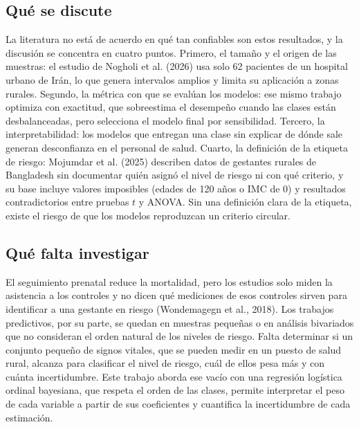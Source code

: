 \subsection{Qué se discute}
La literatura no está de acuerdo en qué tan confiables son estos resultados, y la
discusión se concentra en cuatro puntos. Primero, el tamaño y el origen de las
muestras: el estudio de Nogholi et al. (2026) usa solo 62 pacientes de un hospital
urbano de Irán, lo que genera intervalos amplios y limita su aplicación a zonas
rurales. Segundo, la métrica con que se evalúan los modelos: ese mismo trabajo
optimiza con exactitud, que sobreestima el desempeño cuando las clases están
desbalanceadas, pero selecciona el modelo final por sensibilidad. Tercero, la
interpretabilidad: los modelos que entregan una clase sin explicar de dónde sale
generan desconfianza en el personal de salud. Cuarto, la definición de la
etiqueta de riesgo: Mojumdar et al. (2025) describen datos de gestantes rurales de
Bangladesh sin documentar quién asignó el nivel de riesgo ni con qué criterio, y su
base incluye valores imposibles (edades de 120 años o IMC de 0) y resultados
contradictorios entre pruebas $t$ y ANOVA. Sin una definición clara de la
etiqueta, existe el riesgo de que los modelos reproduzcan un criterio circular.

\subsection{Qué falta investigar}
El seguimiento prenatal reduce la mortalidad, pero los estudios solo miden la
asistencia a los controles y no dicen qué mediciones de esos controles sirven
para identificar a una gestante en riesgo (Wondemagegn et al., 2018). Los trabajos
predictivos, por su parte, se quedan en muestras pequeñas o en análisis
bivariados que no consideran el orden natural de los niveles de riesgo. Falta
determinar si un conjunto pequeño de signos vitales, que se pueden medir en un
puesto de salud rural, alcanza para clasificar el nivel de riesgo, cuál de ellos
pesa más y con cuánta incertidumbre. Este trabajo aborda ese vacío con una
regresión logística ordinal bayesiana, que respeta el orden de las clases, permite
interpretar el peso de cada variable a partir de sus coeficientes y cuantifica la
incertidumbre de cada estimación.
